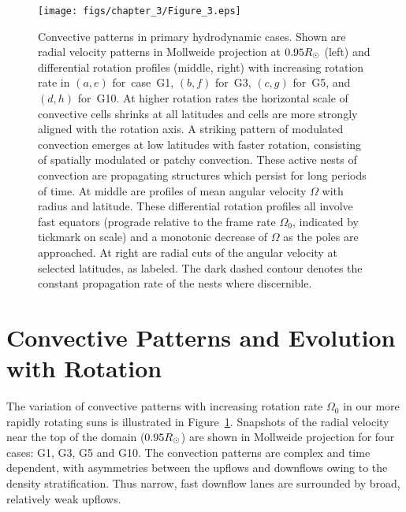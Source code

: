 \begin{figure}[htbp]
  \begin{center}
    \texttt{[image: figs/chapter\_3/Figure\_3.eps]}
  \end{center}
  \caption[Convective patterns in primary hydrodynamic cases]
  {Convective patterns in primary hydrodynamic cases.  
    Shown are radial velocity patterns in Mollweide projection at
  $0.95R_\odot$ (left) and differential rotation profiles
  (middle, right) with increasing rotation rate in $(a,e)$
  for~case~G1, $(b,f)$ for~G3, $(c,g)$ for~G5, and
  $(d,h)$ for~G10.  At higher rotation rates the horizontal scale
  of convective cells shrinks at all latitudes and cells are more
  strongly aligned with the rotation axis.  A striking pattern of
  modulated convection emerges at low latitudes with faster rotation,
  consisting of spatially modulated or patchy convection.  These
  active nests of convection are propagating structures which persist
  for long periods of time.  At middle are profiles of mean angular
  velocity $\Omega$ with radius and latitude.  These differential
  rotation profiles all involve fast equators (prograde relative to
  the frame rate $\Omega_0$, indicated by tickmark on scale) and a monotonic decrease of $\Omega$ as
  the poles are approached.  At right are radial cuts of the angular
  velocity at selected latitudes, as labeled.  The dark dashed contour
  denotes the constant propagation rate of the nests where
  discernible. 
  \label{fig:ab2_turf}}
\end{figure}




\section{Convective Patterns and Evolution with Rotation}
The variation of convective patterns with increasing rotation rate
$\Omega_0$ in our more rapidly rotating suns
is illustrated in Figure~\ref{fig:ab2_turf}.  Snapshots of the radial velocity near
the top of the domain ($0.95 R_\odot$) are shown in Mollweide
projection for four cases: G1, G3, G5 and G10.
The convection patterns are complex and time dependent, with asymmetries
between the upflows and downflows
owing to the density stratification.  Thus narrow, fast downflow lanes are
surrounded by broad, relatively weak upflows.

